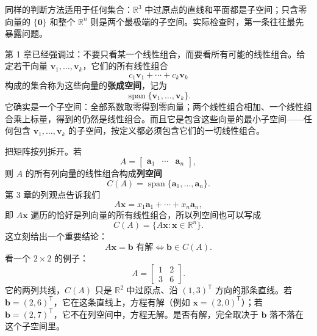\documentclass[UTF8,a4paper,12pt]{ctexart}
\numberwithin{equation}{section}
\newcommand{\R}{\mathbb{R}}
\newcommand{\trans}{^{\mathsf T}}
\begin{document}
	同样的判断方法适用于任何集合：$\R^3$ 中过原点的直线和平面都是子空间；只含零向量的 $\{\bm{0}\}$ 和整个 $\R^n$ 则是两个最极端的子空间。实际检查时，第一条往往最先暴露问题。
	
	第 1 章已经强调过：不要只看某一个线性组合，而要看所有可能的线性组合。给定若干向量 $\bm{v}_1,\ldots,\bm{v}_k$，它们的所有线性组合
	\begin{equation}\label{eq:5.5}
	c_1\bm{v}_1+\cdots+c_k\bm{v}_k
	\end{equation}
	构成的集合称为这些向量的\textbf{张成空间}，记为
	\begin{equation}\label{eq:5.6}
	\operatorname{span}\{\bm{v}_1,\ldots,\bm{v}_k\}.
	\end{equation}
	它确实是一个子空间：全部系数取零得到零向量；两个线性组合相加、一个线性组合乘上标量，得到的仍然是线性组合。而且它是包含这些向量的最小子空间——任何包含 $\bm{v}_1,\ldots,\bm{v}_k$ 的子空间，按定义都必须包含它们的一切线性组合。
	
	把矩阵按列拆开。若
	\begin{equation}\label{eq:5.7}
	A=
	\begin{bmatrix}
		\bm{a}_1&\cdots&\bm{a}_n
	\end{bmatrix},
	\end{equation}
	则 $A$ 的所有列向量的线性组合构成\textbf{列空间}
	\begin{equation}\label{eq:5.8}
	C(A)=\operatorname{span}\{\bm{a}_1,\ldots,\bm{a}_n\}.
	\end{equation}
	第 3 章的列观点告诉我们
	\begin{equation}\label{eq:5.9}
	A\bm{x}=x_1\bm{a}_1+\cdots+x_n\bm{a}_n,
	\end{equation}
	即 $A\bm{x}$ 遍历的恰好是列向量的所有线性组合，所以列空间也可以写成
	\begin{equation}\label{eq:5.10}
	C(A)=\{A\bm{x}:\bm{x}\in\R^n\}.
	\end{equation}
	这立刻给出一个重要结论：
	\begin{equation}\label{eq:5.11}
	\boxed{A\bm{x}=\bm{b}\text{ 有解}\iff \bm{b}\in C(A).}
	\end{equation}
	看一个 $2\times2$ 的例子：
	\begin{equation}\label{eq:5.12}
	A=\begin{bmatrix}1&2\\3&6\end{bmatrix}.
	\end{equation}
	它的两列共线，$C(A)$ 只是 $\R^2$ 中过原点、沿 $(1,3)\trans$ 方向的那条直线。若 $\bm{b}=(2,6)\trans$，它在这条直线上，方程有解（例如 $\bm{x}=(2,0)\trans$）；若 $\bm{b}=(2,7)\trans$，它不在列空间中，方程无解。是否有解，完全取决于 $\bm{b}$ 落不落在这个子空间里。
	
\end{document}
